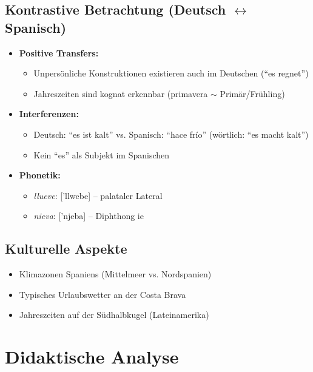 \documentclass[11pt,a4paper]{article}
\begin{document}
\subsection{Kontrastive Betrachtung (Deutsch $\leftrightarrow$ Spanisch)}
\begin{itemize}
    \item \textbf{Positive Transfers:}
    \begin{itemize}
        \item Unpersönliche Konstruktionen existieren auch im Deutschen (``es regnet'')
        \item Jahreszeiten sind kognat erkennbar (primavera $\sim$ Primär/Frühling)
    \end{itemize}
    \item \textbf{Interferenzen:}
    \begin{itemize}
        \item Deutsch: ``es ist kalt'' vs. Spanisch: ``hace frío'' (wörtlich: ``es macht kalt'')
        \item Kein ``es'' als Subjekt im Spanischen
    \end{itemize}
    \item \textbf{Phonetik:}
    \begin{itemize}
        \item \textit{llueve}: ['llwebe] -- palataler Lateral
        \item \textit{nieva}: ['njeba] -- Diphthong ie
    \end{itemize}
\end{itemize}

\subsection{Kulturelle Aspekte}
\begin{itemize}
    \item Klimazonen Spaniens (Mittelmeer vs. Nordspanien)
    \item Typisches Urlaubswetter an der Costa Brava
    \item Jahreszeiten auf der Südhalbkugel (Lateinamerika)
\end{itemize}

\section{Didaktische Analyse}
\end{document}
